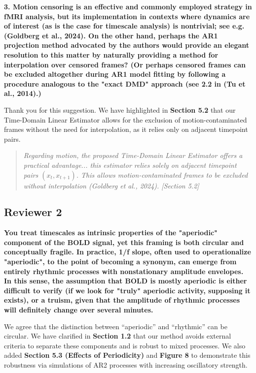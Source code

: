 \documentclass[docs/main.tex]{subfiles}
\newcommand{\reviewercomment}[1]{\vspace{0.3cm}\noindent\textbf{#1}\vspace{0.15cm}}
\newcommand{\manuscriptquote}[1]{\begin{quote}\textit{#1}\end{quote}}
\begin{document}
\reviewercomment{3. Motion censoring is an effective and commonly employed strategy in fMRI analysis, but its implementation in contexts where dynamics are of interest (as is the case for timescale analysis) is nontrivial; see e.g. (Goldberg et al., 2024). On the other hand, perhaps the AR1 projection method advocated by the authors would provide an elegant resolution to this matter by naturally providing a method for interpolation over censored frames? (Or perhaps censored frames can be excluded altogether during AR1 model fitting by following a procedure analogous to the "exact DMD" approach (see 2.2 in (Tu et al., 2014).)}

Thank you for this suggestion. We have highlighted in \textbf{Section 5.2} that our Time-Domain Linear Estimator allows for the exclusion of motion-contaminated frames without the need for interpolation, as it relies only on adjacent timepoint pairs.

\manuscriptquote{Regarding motion, the proposed Time-Domain Linear Estimator offers a practical advantage... this estimator relies solely on adjacent timepoint pairs $(x_t, x_{t+1})$. This allows motion-contaminated frames to be excluded without interpolation (Goldberg et al., 2024). [Section 5.2]}

\subsection*{Reviewer 2}

\reviewercomment{You treat timescales as intrinsic properties of the "aperiodic" component of the BOLD signal, yet this framing is both circular and conceptually fragile. In practice, 1/f slope, often used to operationalize "aperiodic", to the point of becoming a synonym, can emerge from entirely rhythmic processes with nonstationary amplitude envelopes. In this sense, the assumption that BOLD is mostly aperiodic is either difficult to verify (if we look for "truly" aperiodic activity, supposing it exists), or a truism, given that the amplitude of rhythmic processes will definitely change over several minutes.}

We agree that the distinction between ``aperiodic'' and ``rhythmic'' can be circular. We have clarified in \textbf{Section 1.2} that our method avoids external criteria to separate these components and is robust to mixed processes. We also added \textbf{Section 5.3 (Effects of Periodicity)} and \textbf{Figure 8} to demonstrate this robustness via simulations of AR2 processes with increasing oscillatory strength.
\end{document}
